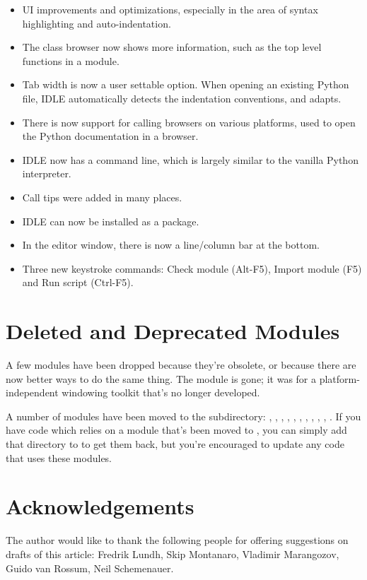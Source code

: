 \documentclass{howto}
\begin{document}
\begin{itemize}
\item  UI improvements and optimizations,
especially in the area of syntax highlighting and auto-indentation.

\item The class browser now shows more information, such as the top
level functions in a module.

\item Tab width is now a user settable option. When opening an existing Python
file, IDLE automatically detects the indentation conventions, and adapts.

\item There is now support for calling browsers on various platforms,
used to open the Python documentation in a browser.

\item IDLE now has a command line, which is largely similar to 
the vanilla Python interpreter.

\item Call tips were added in many places.

\item IDLE can now be installed as a package.

\item In the editor window, there is now a line/column bar at the bottom.

\item Three new keystroke commands: Check module (Alt-F5), Import
module (F5) and Run script (Ctrl-F5).

\end{itemize}

\section{Deleted and Deprecated Modules}

A few modules have been dropped because they're obsolete, or because
there are now better ways to do the same thing.  The 
module is gone; it was for a platform-independent windowing toolkit
that's no longer developed.  

A number of modules have been moved to the
 subdirectory:
, , , , 
, , , 
, , , . 
If you have code which relies on a module  that's been moved to
, you can simply add that directory to   
to get them back, but you're encouraged to update any code that uses
these modules.

\section{Acknowledgements}

The author would like to thank the following people for offering
suggestions on drafts of this article: Fredrik Lundh, Skip
Montanaro, Vladimir Marangozov, Guido van Rossum, Neil Schemenauer.
\end{document}
